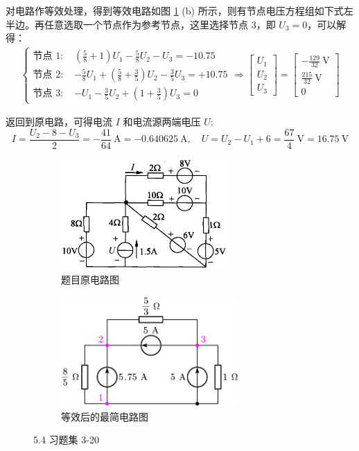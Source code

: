 \documentclass[UTF8]{report}
\theoremstyle{MyLineTheoremStyle} %
\theoremstyle{MyBlockTheoremStyle} %
\theoremstyle{MySubsubsectionStyle} %
\begin{document}
对电路作等效处理，得到等效电路如图 \ref{5.4 习题集 3-20} (b) 所示，则有节点电压方程组如下式左半边。再任意选取一个节点作为参考节点，这里选择节点 3，即 $U_3 = 0$，可以解得：
\begin{align}
\begin{cases}
    \text{节点 1: } &  \left(\frac{5}{8} + 1\right)U_1 -  \frac{5}{8} U_2 -  U_3 = - 10.75
    \\
    \text{节点 2: } & - \frac{5}{8} U_1 + \left( \frac{5}{8} + \frac{3}{5}\right)U_2 - \frac{3}{5} U_3 = +10.75 
    \\
    \text{节点 3: } & - U_1 - \frac{3}{5} U_2 + \left(1 + \frac{3}{5}\right)U_3 = 0
\end{cases}
\Longrightarrow 
\begin{bmatrix}
    U_1 \\ 
    U_2 \\
    U_3
\end{bmatrix} 
= 
\begin{bmatrix}
    -\frac{129}{32} \ \mathrm{V}\\
    \frac{215}{32} \ \mathrm{V}\\
    0
\end{bmatrix}
\end{align}

返回到原电路，可得电流 $I$ 和电流源两端电压 $U$: 
\begin{equation}
I = \frac{U_2 - 8 - U_3}{2} = -\frac{41}{64} \ \mathrm{A} = -0.640625 \ \mathrm{A},\quad U = U_2 - U_1 + 6 = \frac{67}{4} \ \mathrm{V} = 16.75 \ \mathrm{V}
\end{equation}

\begin{figure}[H]\centering
\begin{subfigure}[t]{0.5\columnwidth}\centering
    \includegraphics[height=120pt]{assets/5/5.4 (1).png}
    \caption{ 题目原电路图 }
\end{subfigure}\hfill
\begin{subfigure}[t]{0.5\columnwidth}\centering
    \includegraphics[height=120pt]{assets/5/5.4 (2).png}
    \caption{ 等效后的最简电路图 }
\end{subfigure}
\caption{ 5.4 习题集 3-20 }\label{5.4 习题集 3-20}
\end{figure}
\end{document}
